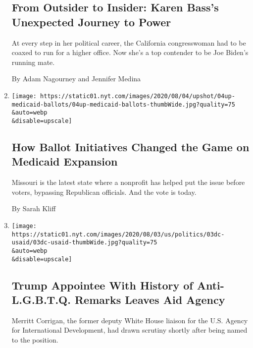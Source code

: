 \begin{enumerate}
  \hypertarget{from-outsider-to-insider-karen-basss-unexpected-journey-to-power-1}{%
  \subsection{From Outsider to Insider: Karen Bass's Unexpected Journey
  to
  Power}\label{from-outsider-to-insider-karen-basss-unexpected-journey-to-power-1}}

  At every step in her political career, the California congresswoman
  had to be coaxed to run for a higher office. Now she's a top contender
  to be Joe Biden's running mate.

  By Adam Nagourney and Jennifer Medina
\item
  \href{/2020/08/04/upshot/missouri-election-medicaid-expansion.html}{}

  \texttt{[image: https://static01.nyt.com/images/2020/08/04/upshot/04up-medicaid-ballots/04up-medicaid-ballots-thumbWide.jpg?quality=75\\\&auto=webp\\\&disable=upscale]}

  \hypertarget{how-ballot-initiatives-changed-the-game-on-medicaid-expansion}{%
  \subsection{How Ballot Initiatives Changed the Game on Medicaid
  Expansion}\label{how-ballot-initiatives-changed-the-game-on-medicaid-expansion}}

  Missouri is the latest state where a nonprofit has helped put the
  issue before voters, bypassing Republican officials. And the vote is
  today.

  By Sarah Kliff
\item
  \href{/2020/08/03/us/politics/merritt-corrigan-usaid.html}{}

  \texttt{[image: https://static01.nyt.com/images/2020/08/03/us/politics/03dc-usaid/03dc-usaid-thumbWide.jpg?quality=75\\\&auto=webp\\\&disable=upscale]}

  \hypertarget{trump-appointee-with-history-of-anti-lgbtq-remarks-leaves-aid-agency}{%
  \subsection{Trump Appointee With History of Anti-L.G.B.T.Q. Remarks
  Leaves Aid
  Agency}\label{trump-appointee-with-history-of-anti-lgbtq-remarks-leaves-aid-agency}}

  Merritt Corrigan, the former deputy White House liaison for the U.S.
  Agency for International Development, had drawn scrutiny shortly after
  being named to the position.


\end{enumerate}
